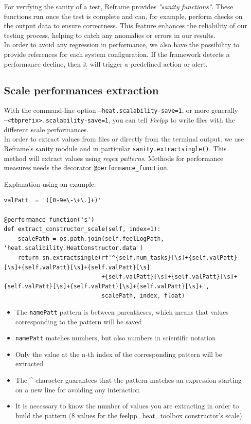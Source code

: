 \documentclass[12pt]{article}
\begin{document}
For verifying the sanity of a test, Reframe provides \textit{"sanity functions"}. These functions run once the test is complete and can, for example, perform checks on the output data to ensure correctness. 
This feature enhances the reliability of our testing process, helping to catch any anomalies or errors in our results. \\
In order to avoid any regression in performance, we also have the possibility to provide references for each system configuration.
If the framework detects a performance decline, then it will trigger a predefined action or alert.

\subsection{Scale performances extraction}
With the command-line option \small{\texttt{--heat.scalability-save=1}}, or more generally \\ \small{\texttt{--<tbprefix>.scalability-save=1}}, you can tell \textit{Feelpp} to write files with the different scale performances. \\
In order to extract values from files or directly from the terminal output, we use Reframe's sanity module and in particular \texttt{sanity.extractsingle()}.
This method will extract values using \textit{regex patterns}. Methods for performance measures needs the decorator \small{\texttt{@performance\_function}}.

Explanation using an example:
\begin{scriptsize}
\begin{verbatim}
valPatt  = '([0-9e\-\+\.]+)'

@performance_function('s')
def extract_constructor_scale(self, index=1):
    scalePath = os.path.join(self.feelLogPath, 'heat.scalibility.HeatConstructor.data')
    return sn.extractsingle(rf'^{self.num_tasks}[\s]+{self.valPatt}[\s]+{self.valPatt}[\s]+{self.valPatt}[\s]
                            +{self.valPatt}[\s]+{self.valPatt}[\s]+{self.valPatt}[\s]+{self.valPatt}[\s]+{self.valPatt}[\s]+',
                            scalePath, index, float)
\end{verbatim}
\end{scriptsize}

\begin{itemize}
    \item The \small{\texttt{namePatt}} pattern is between parentheses, which means that values corresponding to the pattern will be saved
    \item \small{\texttt{namePatt}} matches numbers, but also numbers in scientific notation
    \item Only the value at the n-th index of the corresponding pattern will be extracted
    \item The \^{} character guarantees that the pattern matches an expression starting on a new line for avoiding any interaction
    \item It is necessary to know the number of values you are extracting in order to build the pattern (8 values for the feelpp\_heat\_toolbox constructor's scale)
\end{itemize}
\end{document}
